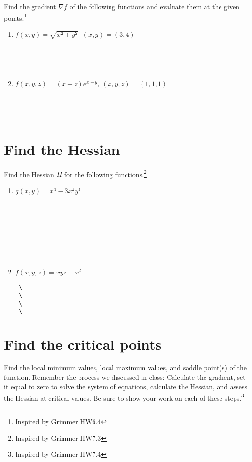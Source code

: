 \documentclass[
]{article}
\begin{document}
Find the gradient \(\nabla f\) of the following functions and evaluate
them at the given points.\footnote{Inspired by Grimmer HW6.4}

\begin{enumerate}
\def\labelenumi{\alph{enumi}.}
\item
  \(f(x,y) = \sqrt{x^2 + y^2}\), \quad \((x,y) = (3,4)\)

  ~\\
  \strut \\
\item
  \(f(x,y,z) = (x+z)e^{x-y}\), \quad \((x,y,z) = (1,1,1)\)

  ~\\
  \strut \\
\end{enumerate}

\section{Find the Hessian}\label{find-the-hessian}

Find the Hessian \(H\) for the following functions.\footnote{Inspired by
  Grimmer HW7.3}

\begin{enumerate}
\def\labelenumi{\alph{enumi}.}
\item
  \(g(x,y) = x^4 - 3x^2 y^3\)

  \strut \\
  \strut ~\\
  \strut ~ ~\\
  \strut ~
\item
  \(f(x,y,z) = xyz - x^2\)

\begin{verbatim}
 \     
 \  
 \     
 \
\end{verbatim}
\end{enumerate}

\section{Find the critical points}\label{find-the-critical-points}

Find the local minimum values, local maximum values, and saddle point(s)
of the function. Remember the process we discussed in class: Calculate
the gradient, set it equal to zero to solve the system of equations,
calculate the Hessian, and assess the Hessian at critical values. Be
sure to show your work on each of these steps.\footnote{Inspired by
  Grimmer HW7.4}
\end{document}
